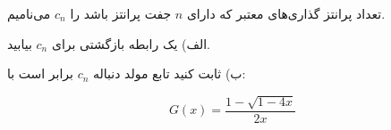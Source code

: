 \EXERCISE
تعداد پرانتز گذاری‌های معتبر که دارای 
$n$
 جفت پرانتز باشد را 
$c_n$
  می‌نامیم.
  
  الف) یک رابطه بازگشتی برای 
$c_n$
  بیابید.
  
   ب) ثابت کنید تابع مولد دنباله 
$c_n$
    برابر است با:
    
$$G(x) = \frac{1 - \sqrt{1-4x}}{2x}$$